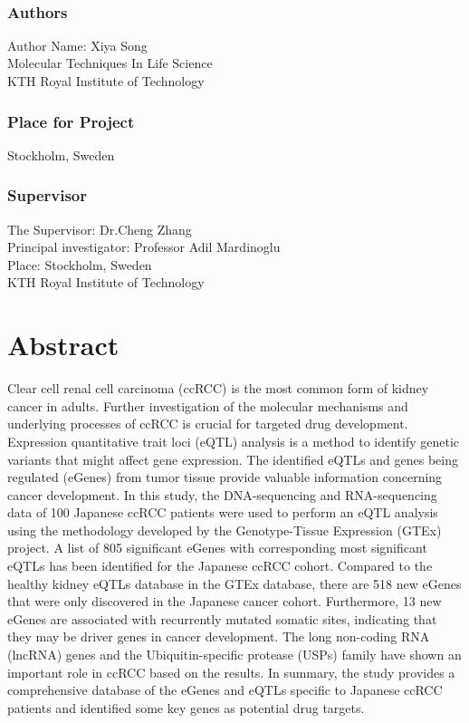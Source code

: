 \newpage
\thispagestyle{plain}
~\\
\vfill
{ 
	\subsection*{Authors}
	Author Name: Xiya Song\\
	Molecular Techniques In Life Science\\
	KTH Royal Institute of Technology
	
	\subsection*{Place for Project}
	Stockholm, Sweden\\
	
	\subsection*{Supervisor }
	The Supervisor: Dr.Cheng Zhang\\
	Principal investigator: Professor Adil Mardinoglu \\
	Place: Stockholm, Sweden \\
	KTH Royal Institute of Technology
	~
}


\newpage
\thispagestyle{plain}
\chapter*{Abstract}

Clear cell renal cell carcinoma (ccRCC) is the most common form of kidney cancer in adults. Further investigation of the molecular mechanisms and underlying processes of ccRCC is crucial for targeted drug development. Expression quantitative trait loci (eQTL) analysis is a method to identify genetic variants that might affect gene expression. The identified eQTLs and genes being regulated (eGenes) from tumor tissue provide valuable information concerning cancer development. In this study, the DNA-sequencing and RNA-sequencing data of 100 Japanese ccRCC patients were used to perform an eQTL analysis using the methodology developed by the Genotype-Tissue Expression (GTEx) project. A list of 805 significant eGenes with corresponding most significant eQTLs has been identified for the Japanese ccRCC cohort. Compared to the healthy kidney eQTLs database in the GTEx database, there are 518 new eGenes that were only discovered in the Japanese cancer cohort. Furthermore, 13 new eGenes are associated with recurrently mutated somatic sites, indicating that they may be driver genes in cancer development. The long non-coding RNA (lncRNA) genes and the Ubiquitin-specific protease (USPs) family have shown an important role in ccRCC based on the results. In summary, the study provides a comprehensive database of the eGenes and eQTLs specific to Japanese ccRCC patients and identified some key genes as potential drug targets.

